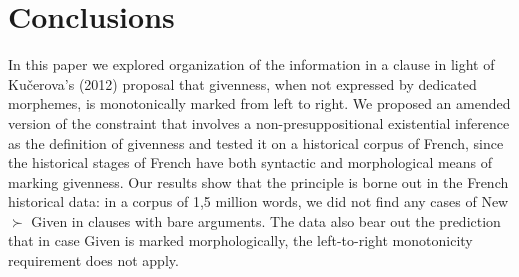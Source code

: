 \documentclass[output=paper,modfonts,nonflat]{langsci/langscibook}
\begin{document}



\section{Conclusions} 
\label{section:conclusions}



In this paper we explored organization of the information in a clause in light of Ku\v{c}erova's (2012) proposal that givenness, when not expressed by dedicated morphemes, is monotonically marked from left to right. We proposed an amended version of the constraint that involves a non-presuppositional existential inference as the definition of givenness and tested it on a historical corpus of French, since the historical stages of French have both syntactic and morphological means of marking givenness. Our results show that the principle is borne out in the French historical data: in a corpus of 1,5 million words, we did not find any cases of New $\succ$ Given in clauses with bare arguments. The data also bear out the prediction that in case Given is marked morphologically, the left-to-right monotonicity requirement does not apply.
\end{document}
